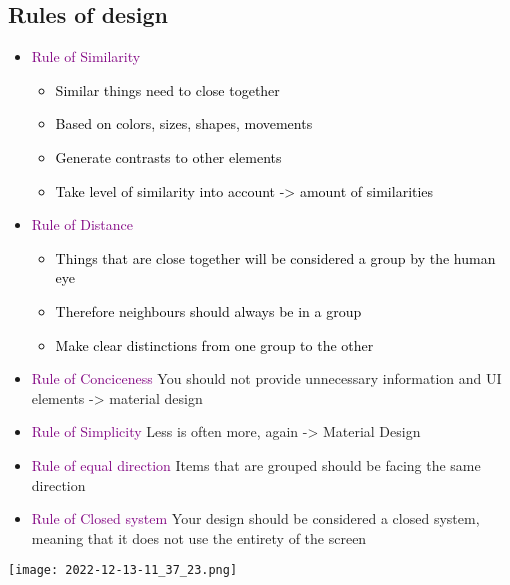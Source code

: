 \documentclass[main.tex,fontsize=6pt,paper=a4,paper=landscape,DIV=calc,]{scrartcl}
\begin{document}
\begin{multicols*}{4}
\subsection{Rules of design}  
\begin{itemize}
\item \textcolor{purple}{Rule of Similarity}\newline
  \begin{itemize}
  \item \textcolor{black}{Similar things need to close together}
  \item \textcolor{black}{Based on colors, sizes, shapes, movements}
  \item \textcolor{black}{Generate contrasts to other elements}
  \item \textcolor{black}{Take level of similarity into account -> amount of similarities}
  \end{itemize} 
\item \textcolor{purple}{Rule of Distance}\newline
  \begin{itemize}
  \item \textcolor{black}{Things that are close together will be considered a group by the human eye}
  \item \textcolor{black}{Therefore neighbours should always be in a group}
  \item \textcolor{black}{Make clear distinctions from one group to the other}
  \end{itemize} 
\item \textcolor{purple}{Rule of Conciceness}\newline
  You should not provide unnecessary information and UI elements -> material design
\item \textcolor{purple}{Rule of Simplicity}\newline
  Less is often more, again -> Material Design
\item \textcolor{purple}{Rule of equal direction}\newline
  Items that are grouped should be facing the same direction
\item \textcolor{purple}{Rule of Closed system}\newline
Your design should be considered a closed system, meaning that it does not use the entirety of the screen
\end{itemize}
\vspace{2mm}
\texttt{[image: 2022-12-13-11\_37\_23.png]}


\end{multicols*}
\end{document}
